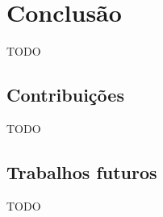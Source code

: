 \chapter{Conclusão}
\label{chap:conclusao}

TODO


\section{Contribuições}

TODO

\section{Trabalhos futuros}

TODO